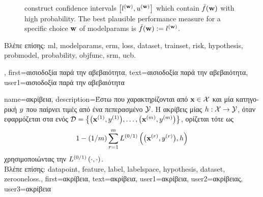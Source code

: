 {{\begin{figure}[H]
\begin{center}
{	construct confidence intervals $\big[ l^{({\bf w})},  u^{({\bf w})} \big]$ which contain $\bar{f}({\bf w})$  
	with high probability. The best plausible performance measure for a specific choice ${\bf w}$ of \gls{modelparams} 
	is $\tilde{f}({\bf w}) := l^{({\bf w})}$.} 
	\end{center}
		\end{figure}
	\foreignlanguage{greek}{Βλέπε επίσης:} \gls{ml}, \gls{modelparams}, \gls{erm}, \gls{loss}, \gls{dataset}, \gls{trainset}, \gls{risk}, \gls{hypothesis}, \gls{probmodel}, \gls{probability}, \gls{objfunc}, \gls{srm}, \gls{ucb}.},
	first={\foreignlanguage{greek}{αισιοδοξία παρά την αβεβαιότητα}},
	text={\foreignlanguage{greek}{αισιοδοξία παρά την αβεβαιότητα}},
	user1={\foreignlanguage{greek}{αισιοδοξία παρά την αβεβαιότητα}} %
}

{name={\foreignlanguage{greek}{ακρίβεια}},
	description={\foreignlanguage{greek}{Έστω}  
		\foreignlanguage{greek}{που χαρακτηρίζονται από}  ${\bf x} \in \mathcal{X}$ 
		\foreignlanguage{greek}{και μία κατηγορική} 
		$y$ \foreignlanguage{greek}{που παίρνει τιμές από ένα πεπερασμένο}  $\mathcal{Y}$. 
		\foreignlanguage{greek}{Η ακρίβεις μίας}  
		$h: \mathcal{X} \rightarrow \mathcal{Y}$, \foreignlanguage{greek}{όταν εφαρμόζεται στα}  
		 \foreignlanguage{greek}{ενός}  
		$\mathcal{D} = \big\{ \big({\bf x}^{(1)}, y^{(1)} \big), \ldots, \big({\bf x}^{(m)},y^{(m)}\big) \big\}$, 
		\foreignlanguage{greek}{ορίζεται τότε ως} $$1 - (1/m)\sum_{r=1}^{m} L^{(0/1)}\left(\big({\bf x}^{(r)},y^{(r)}\big),h \right)$$ \foreignlanguage{greek}{χρησιμοποιώντας την}  $L^{(0/1)}\left(\cdot,\cdot \right)$.\\
		\foreignlanguage{greek}{Βλέπε επίσης:} \gls{datapoint}, \gls{feature}, \gls{label}, \gls{labelspace}, \gls{hypothesis}, \gls{dataset}, \gls{zerooneloss}.},
	first={\foreignlanguage{greek}{ακρίβεια}},
	text={\foreignlanguage{greek}{ακρίβεια}},
	user1={\foreignlanguage{greek}{ακρίβεια}}, %
	user2={\foreignlanguage{greek}{ακρίβειας}}, %
	user3={\foreignlanguage{greek}{ακρίβεια}} %
}

